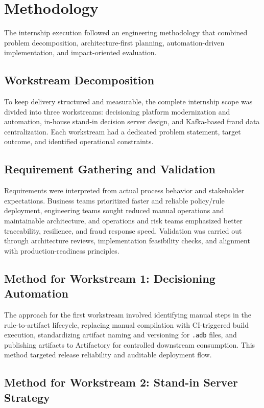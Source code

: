 \chapter{Methodology}

The internship execution followed an engineering methodology that combined problem decomposition, architecture-first planning, automation-driven implementation, and impact-oriented evaluation.

\section{Workstream Decomposition}

To keep delivery structured and measurable, the complete internship scope was divided into three workstreams: decisioning platform modernization and automation, in-house stand-in decision server design, and Kafka-based fraud data centralization. Each workstream had a dedicated problem statement, target outcome, and identified operational constraints.

\section{Requirement Gathering and Validation}

Requirements were interpreted from actual process behavior and stakeholder expectations. Business teams prioritized faster and reliable policy/rule deployment, engineering teams sought reduced manual operations and maintainable architecture, and operations and risk teams emphasized better traceability, resilience, and fraud response speed. Validation was carried out through architecture reviews, implementation feasibility checks, and alignment with production-readiness principles.

\section{Method for Workstream 1: Decisioning Automation}

The approach for the first workstream involved identifying manual steps in the rule-to-artifact lifecycle, replacing manual compilation with CI-triggered build execution, standardizing artifact naming and versioning for \texttt{.adb} files, and publishing artifacts to Artifactory for controlled downstream consumption. This method targeted release reliability and auditable deployment flow.

\section{Method for Workstream 2: Stand-in Server Strategy}

